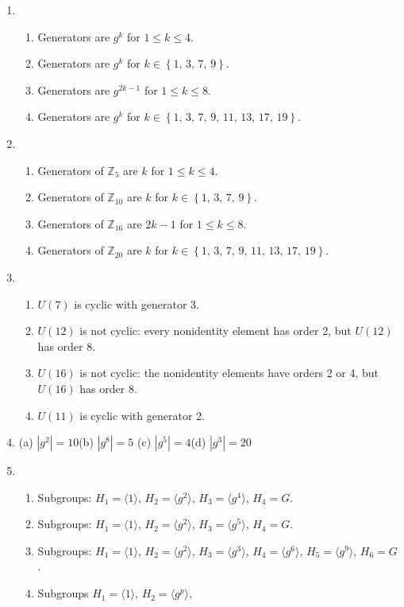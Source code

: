 \documentclass[12pt]{article}
\newcommand{\order}[1]{\ensuremath{|#1|}}
\newcommand{\units}[1]{\ensuremath{U(#1)}}
\newcommand{\<}{\ensuremath{\langle}}
\renewcommand{\>}{\ensuremath{\rangle}}
\newcommand{\Z} {{\mathbb Z}}
\newcommand{\set}[1]{\left\{#1\right\}}
\theoremstyle{plain}
\theoremstyle{definition}
\begin{document}
\begin{enumerate}
\item \begin{enumerate}
\item Generators are $g^k$ for $1\le k\le 4$.
\item Generators are $g^k$ for $k\in\set{1,\,3,\,7,\,9}$.
\item Generators are $g^{2k-1}$ for $1\le k\le 8$.
\item Generators are $g^k$ for $k\in\set{1,\,3,\,7,\,9,\,11,\,13,\,17,\,19}$.
\end{enumerate}
\item \begin{enumerate}
\item Generators of $\Z_5$ are $k$ for $1\le k\le 4$.
\item Generators of $\Z_{10}$ are $k$ for $k\in\set{1,\,3,\,7,\,9}$.
\item Generators of $\Z_{16}$ are $2k-1$ for $1\le k\le 8$.
\item Generators of $\Z_{20}$ are $k$ for $k\in\set{1,\,3,\,7,\,9,\,11,\,13,\,17,\,19}$.
\end{enumerate}
\item \begin{enumerate}
\item $\units{7}$ is cyclic with generator 3.
\item $\units{12}$ is not cyclic: every nonidentity element has order 2, but
$\units{12}$ has order 8.
\item $\units{16}$ is not cyclic: the nonidentity elements have orders 2 or 4, but $\units{16}$ has order 8.
\item $\units{11}$ is cyclic with generator 2.
\end{enumerate}
\item
(a) $\order{g^2}=10$\qquad (b) $\order{g^8}=5$ \qquad (c) $\order{g^5}=4$\qquad (d)
$\order{g^3}=20$
\item \begin{enumerate}
\item Subgroups:  $H_1=\langle 1\rangle$, $H_2=\langle g^2\rangle$,
$H_3=\langle g^4\rangle$, $H_4=G$.
\item Subgroups: $H_1=\langle 1\rangle$, $H_2=\langle g^2\rangle$,
$H_3=\langle g^5\rangle$, $H_4=G$.
\item Subgroups: $H_1=\langle 1\rangle$, $H_2=\langle g^2\rangle$,
$H_3=\langle g^3\rangle$, $H_4=\langle g^6\rangle$, 
$H_5=\langle g^9\rangle $, $H_6=G$.
\item Subgroups $H_1=\langle 1\rangle$, $H_2=\langle g^p\rangle$,

\end{enumerate}
\end{enumerate}
\end{document}
